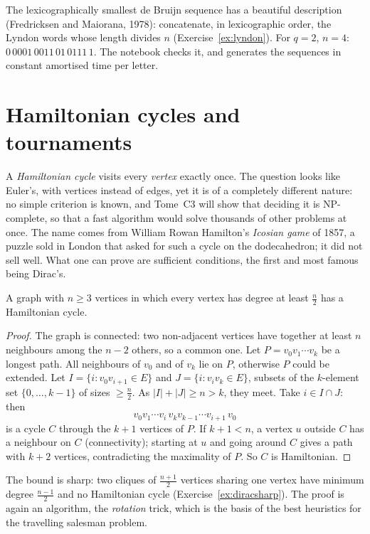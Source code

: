 \begin{remark}
The lexicographically smallest de Bruijn sequence has a beautiful description (Fredricksen and Maiorana, 1978): concatenate,
in lexicographic order, the Lyndon words whose length divides $n$ (Exercise~\ref{ex:lyndon}). For $q=2$, $n=4$: $0\,0001\,0011\,01\,0111\,1$. The
notebook checks it, and generates the sequences in constant amortised time per letter.
\end{remark}

\section{Hamiltonian cycles and tournaments}

A \emph{Hamiltonian cycle} visits every \emph{vertex} exactly once. The question looks like Euler's, with vertices instead of edges, yet it is of a
completely different nature: no simple criterion is known, and Tome~C3 will show that deciding it is NP-complete, so that a
fast algorithm would solve thousands of other problems at once. The name comes from William Rowan Hamilton's \emph{Icosian game} of
1857, a puzzle sold in London that asked for such a cycle on the dodecahedron; it did not sell well. What one can prove are
sufficient conditions, the first and most famous being Dirac's.

\begin{theorem}[Dirac, 1952]\label{thm:dirac}
A graph with $n\ge3$ vertices in which every vertex has degree at least $\frac n2$ has a Hamiltonian cycle.
\end{theorem}
\begin{proof}
The graph is connected: two non-adjacent vertices have together at least $n$ neighbours among the $n-2$ others, so a common one. Let
$P=v_0v_1\cdots v_k$ be a longest path. All neighbours of $v_0$ and of $v_k$ lie on $P$, otherwise $P$ could be extended. Let $I=\{i:v_0v_{i+1}\in E\}$ and
$J=\{i:v_iv_k\in E\}$, subsets of the $k$-element set $\{0,\dots,k-1\}$ of sizes $\ge\frac n2$. As $|I|+|J|\ge n>k$, they meet. Take $i\in I\cap J$: then
\[
v_0v_1\cdots v_i\,v_kv_{k-1}\cdots v_{i+1}\,v_0
\]
is a cycle $C$ through the $k+1$ vertices of $P$. If $k+1<n$, a vertex $u$ outside $C$ has a neighbour on $C$ (connectivity); starting at $u$
and going around $C$ gives a path with $k+2$ vertices, contradicting the maximality of $P$. So $C$ is Hamiltonian.
\end{proof}

The bound is sharp: two cliques of $\frac{n+1}2$ vertices sharing one vertex have minimum degree $\frac{n-1}2$ and no Hamiltonian cycle
(Exercise~\ref{ex:diracsharp}). The proof is again an algorithm, the \emph{rotation} trick, which is the basis of the best heuristics
for the travelling salesman problem.

